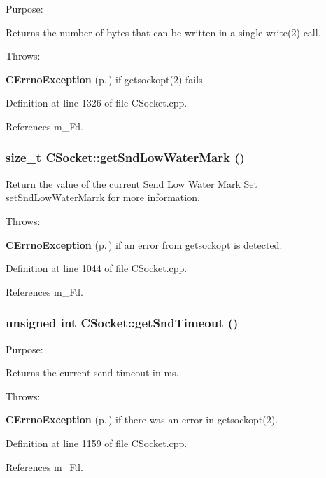 Purpose:

Returns the number of bytes that can be written in a single write(2) call.

Throws:\begin{CompactItemize}
\item 
{\bf CErrno\-Exception} {\rm (p.\,\pageref{classCErrnoException})} if getsockopt(2) fails. \end{CompactItemize}


Definition at line 1326 of file CSocket.cpp.

References m\_\-Fd.
\subsubsection{\setlength{\rightskip}{0pt plus 5cm}size\_\-t CSocket::get\-Snd\-Low\-Water\-Mark ()}\label{classCSocket_a19}


Return the value of the current Send Low Water Mark Set set\-Snd\-Low\-Water\-Marrk for more information.

Throws:\begin{CompactItemize}
\item 
{\bf CErrno\-Exception} {\rm (p.\,\pageref{classCErrnoException})} if an error from getsockopt is detected. \end{CompactItemize}


Definition at line 1044 of file CSocket.cpp.

References m\_\-Fd.
\subsubsection{\setlength{\rightskip}{0pt plus 5cm}unsigned int CSocket::get\-Snd\-Timeout ()}\label{classCSocket_a23}


Purpose:

Returns the current send timeout in ms.

Throws:\begin{CompactItemize}
\item 
{\bf CErrno\-Exception} {\rm (p.\,\pageref{classCErrnoException})} if there was an error in getsockopt(2). \end{CompactItemize}


Definition at line 1159 of file CSocket.cpp.

References m\_\-Fd.
